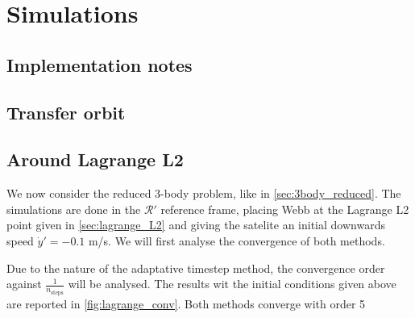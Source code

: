 \section{Simulations}

\subsection{Implementation notes}

\subsection{Transfer orbit}

\subsection{Around Lagrange L2}

We now consider the reduced 3-body problem, like in \ref{sec:3body_reduced}. The simulations are done in the \(\mathcal R'\) reference frame, placing Webb at the Lagrange L2 point given in \ref{sec:lagrange_L2} and giving the satelite an initial downwards speed \(\dot y' = -0.1\) m/s. We will first analyse the convergence of both methods.

Due to the nature of the adaptative timestep method, the convergence order against \(\frac{1}{n_\textrm{steps}}\) will be analysed. The results wit the initial conditions given above are reported in \autoref{fig:lagrange_conv}. Both methods converge with order 5 

